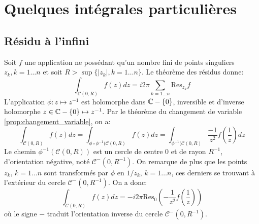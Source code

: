 \section{Quelques intégrales particulières} 
\subsection{Résidu à l'infini}
Soit $f$ une application ne possédant qu'un nombre fini de points singuliers $z_k,k=1\dots n$ et soit $R> \sup \{|z_k|, k=1\dots n\}$. Le théorème des résidus donne:
\[
\int_{\mathcal{C}(0,R)} f(z) dz = i 2 \pi \sum_{k=1\dots n}  \text{Res}_{z_k}f
\]
 L'application $ \phi \colon z \mapsto z^{-1}$ est holomorphe dans $\mathbb{C} - \{0\}$, inversible et d'inverse holomorphe $z \in \mathbb{C} - \{0\} \mapsto z^{-1}.$ 
Par le théorème du changement de variable \ref{prop:changement_variable}, on a:
\[
\int_{\mathcal{C}(0,R)} f(z) dz = \int_{\phi \circ \phi^{-1}( \mathcal{C}(0,R)} 
f(z) dz = \int_{\phi^{-1}(\mathcal{C}(0,R)} \frac{-1}{z^2}f\left(
\frac{1}{z}\right) dz
\]
Le chemin $\phi^{-1}(\mathcal{C}(0,R))$ est un cercle de centre $0$ et de rayon $R^{-1}$, d'orientation négative, noté $\mathcal{C}^-(0,R^{-1})$.
On remarque de plus que les points $z_k, \, k=1\dots n$ sont transformés par $\phi$ en $1/z_k, \, k=1\dots n$, ces derniers se trouvant à l'extérieur du cercle $\mathcal{C}^-(0,R^{-1}).$ On a donc:
\begin{equation}
\label{eq:res_infini}
\int_{\mathcal{C}(0,R)} f(z) dz = -i 2 \pi \text{Res}_0\left( 
-\frac{1}{z^2} f\left(\frac{1}{z}\right)\right) 
\end{equation}
où le signe $-$ traduit l'orientation inverse du cercle $\mathcal{C}^-(0,R^{-1}).$


